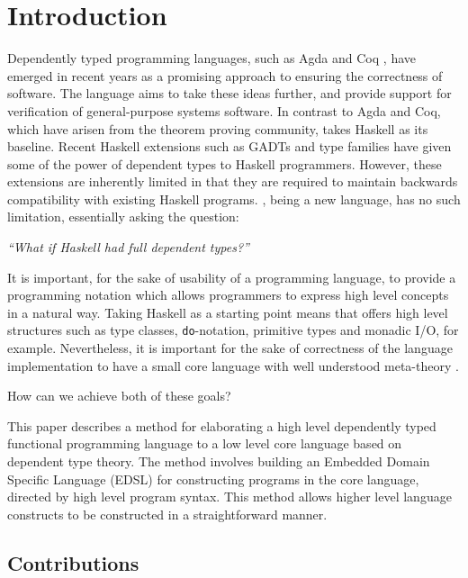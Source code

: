 \section{Introduction}

Dependently typed programming languages, such as Agda \cite{norell2007thesis}
and Coq \cite{Bertot2004}, have emerged in recent years as a promising approach
to ensuring the correctness of software. The \Idris{} language
\cite{Brady2011a} aims to take these ideas further, and provide support for
verification of general-purpose systems software. In contrast to Agda and Coq,
which have arisen from the theorem proving community, \Idris{} takes Haskell as
its baseline.  Recent Haskell extensions such as GADTs and type families have
given some of the power of dependent types to Haskell programmers. However,
these extensions are inherently limited in that they are required to maintain
backwards compatibility with existing Haskell programs.  \Idris{}, being a new
language, has no such limitation, essentially asking the question:

\begin{center}
\emph{``What if Haskell had \emph{full} dependent types?''}
\end{center}

It is important, for the sake of usability of a programming language, to provide
a programming notation which allows programmers to express high level concepts
in a natural way. Taking Haskell as a starting point means that \Idris{} offers
high level structures such as type classes, \texttt{do}-notation, primitive types
and monadic I/O, for example.
Nevertheless, it is important for the sake of correctness of the language implementation
to have a small core language with well understood meta-theory
\cite{Altenkirch2010}.

How can we achieve both of these goals?

This paper describes a method for elaborating a high level dependently
typed functional programming language to a low level core
language based on dependent type theory.
The method involves building an Embedded Domain Specific Language (EDSL) for constructing
programs in the core language, directed by high level program syntax. 
This method allows higher level language constructs to be constructed in a straightforward
manner.


\subsection{Contributions}

